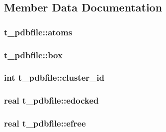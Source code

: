 \subsection{\-Member \-Data \-Documentation}
\hypertarget{structt__pdbfile_a574712ac174331a120f97ff8fc9a78a6}{
\subsubsection[{atoms}]{ {\bf t\-\_\-pdbfile\-::atoms}}}\label{structt__pdbfile_a574712ac174331a120f97ff8fc9a78a6}
\hypertarget{structt__pdbfile_a7dbe641aeebaf4f8dbc499fa9327258b}{
\subsubsection[{box}]{ {\bf t\-\_\-pdbfile\-::box}}}\label{structt__pdbfile_a7dbe641aeebaf4f8dbc499fa9327258b}
\hypertarget{structt__pdbfile_a2e7eec4f6c90531aab936fd83c3170b6}{
\subsubsection[{cluster\-\_\-id}]{\setlength{\rightskip}{0pt plus 5cm}int {\bf t\-\_\-pdbfile\-::cluster\-\_\-id}}}\label{structt__pdbfile_a2e7eec4f6c90531aab936fd83c3170b6}
\hypertarget{structt__pdbfile_a52daa1ed729a42ed52302993ca707b7a}{
\subsubsection[{edocked}]{\setlength{\rightskip}{0pt plus 5cm}real {\bf t\-\_\-pdbfile\-::edocked}}}\label{structt__pdbfile_a52daa1ed729a42ed52302993ca707b7a}
\hypertarget{structt__pdbfile_a9b8e5f9f03160157aad99c528c6b4534}{
\subsubsection[{efree}]{\setlength{\rightskip}{0pt plus 5cm}real {\bf t\-\_\-pdbfile\-::efree}}}\label{structt__pdbfile_a9b8e5f9f03160157aad99c528c6b4534}

